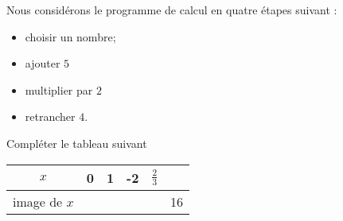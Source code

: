 
\begin{exercice}\label{exoSeconde-0042}

    Nous considérons le programme de calcul en quatre étapes suivant :
    \begin{itemize}
        \item
            choisir un nombre;
        \item
            ajouter \( 5\)
        \item
            multiplier par \( 2\)
        \item
            retrancher \( 4\).
    \end{itemize}
    Compléter le tableau suivant
    \begin{center}
        \begin{tabular}[h]{|c||c|c|c|c|c|}
            \hline
            \( x\)&0&1&-2&$\frac{ 2 }{ 3 }$&\\
            \hline
            image de \( x\)& & & & & 16\\
            \hline
        \end{tabular}
    \end{center}

\end{exercice}
